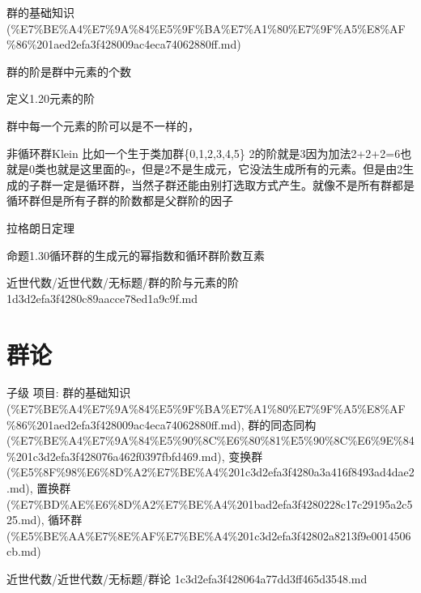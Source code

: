 \begin{note}[来源上级主题]

群的基础知识 (\%E7\%BE\%A4\%E7\%9A\%84\%E5\%9F\%BA\%E7\%A1\%80\%E7\%9F\%A5\%E8\%AF\%86\%201aed2efa3f428009ac4eca74062880ff.md)

\end{note}

\begin{note}[群的阶与元素的阶]

群的阶是群中元素的个数

定义1.20元素的阶

群中每一个元素的阶可以是不一样的，

非循环群Klein 比如一个生于类加群\{0,1,2,3,4,5\} 2的阶就是3因为加法2+2+2=6也就是0类也就是这里面的e，但是2不是生成元，它没法生成所有的元素。但是由2生成的子群一定是循环群，当然子群还能由别打选取方式产生。就像不是所有群都是循环群但是所有子群的阶数都是父群阶的因子

拉格朗日定理

命题1.30循环群的生成元的幂指数和循环群阶数互素

\end{note}

\begin{note}[来源路径]

近世代数/近世代数/无标题/群的阶与元素的阶 1d3d2efa3f4280c89aacce78ed1a9c9f.md

\end{note}

\section*{群论}

\begin{note}[群论]

子级 项目: 群的基础知识 (\%E7\%BE\%A4\%E7\%9A\%84\%E5\%9F\%BA\%E7\%A1\%80\%E7\%9F\%A5\%E8\%AF\%86\%201aed2efa3f428009ac4eca74062880ff.md), 群的同态同构 (\%E7\%BE\%A4\%E7\%9A\%84\%E5\%90\%8C\%E6\%80\%81\%E5\%90\%8C\%E6\%9E\%84\%201c3d2efa3f428076a462f0397fbfd469.md), 变换群 (\%E5\%8F\%98\%E6\%8D\%A2\%E7\%BE\%A4\%201c3d2efa3f4280a3a416f8493ad4dae2.md), 置换群 (\%E7\%BD\%AE\%E6\%8D\%A2\%E7\%BE\%A4\%201bad2efa3f4280228c17c29195a2c525.md), 循环群 (\%E5\%BE\%AA\%E7\%8E\%AF\%E7\%BE\%A4\%201c3d2efa3f42802a8213f9e0014506cb.md)

\end{note}

\begin{note}[来源路径]

近世代数/近世代数/无标题/群论 1c3d2efa3f428064a77dd3ff465d3548.md

\end{note}

